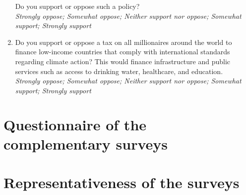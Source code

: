 \begin{enumerate}
Do you support or oppose such a policy? 
\\ \textit{Strongly oppose; Somewhat oppose; Neither support nor oppose; Somewhat support; Strongly support}
\item \label{q:millionaire_tax} Do you support or oppose a tax on all millionaires around the world to finance low-income countries that comply with international standards regarding climate action? 
This would finance infrastructure and public services such as access to drinking water, healthcare, and education.
\\ \textit{Strongly oppose; Somewhat oppose; Neither support nor oppose; Somewhat support; Strongly support}
\end{enumerate}



\clearpage
\section{Questionnaire of the complementary surveys}\label{app:questionnaire}


\clearpage
\section{Representativeness of the surveys}\label{app:representativeness}


